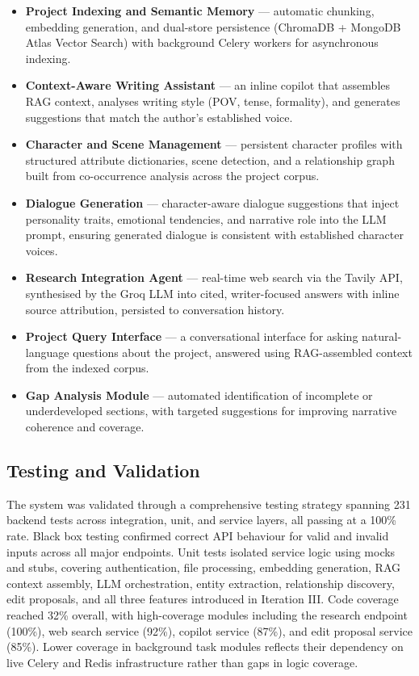 \begin{itemize}
    \item \textbf{Project Indexing and Semantic Memory} — automatic chunking, embedding generation, and dual-store persistence (ChromaDB + MongoDB Atlas Vector Search) with background Celery workers for asynchronous indexing.
    \item \textbf{Context-Aware Writing Assistant} — an inline copilot that assembles RAG context, analyses writing style (POV, tense, formality), and generates suggestions that match the author's established voice.
    \item \textbf{Character and Scene Management} — persistent character profiles with structured attribute dictionaries, scene detection, and a relationship graph built from co-occurrence analysis across the project corpus.
    \item \textbf{Dialogue Generation} — character-aware dialogue suggestions that inject personality traits, emotional tendencies, and narrative role into the LLM prompt, ensuring generated dialogue is consistent with established character voices.
    \item \textbf{Research Integration Agent} — real-time web search via the Tavily API, synthesised by the Groq LLM into cited, writer-focused answers with inline source attribution, persisted to conversation history.
    \item \textbf{Project Query Interface} — a conversational interface for asking natural-language questions about the project, answered using RAG-assembled context from the indexed corpus.
    \item \textbf{Gap Analysis Module} — automated identification of incomplete or underdeveloped sections, with targeted suggestions for improving narrative coherence and coverage.
\end{itemize}

\subsection{Testing and Validation}

The system was validated through a comprehensive testing strategy spanning 231 backend tests across integration, unit, and service layers, all passing at a 100\% rate. Black box testing confirmed correct API behaviour for valid and invalid inputs across all major endpoints. Unit tests isolated service logic using mocks and stubs, covering authentication, file processing, embedding generation, RAG context assembly, LLM orchestration, entity extraction, relationship discovery, edit proposals, and all three features introduced in Iteration III. Code coverage reached 32\% overall, with high-coverage modules including the research endpoint (100\%), web search service (92\%), copilot service (87\%), and edit proposal service (85\%). Lower coverage in background task modules reflects their dependency on live Celery and Redis infrastructure rather than gaps in logic coverage.

